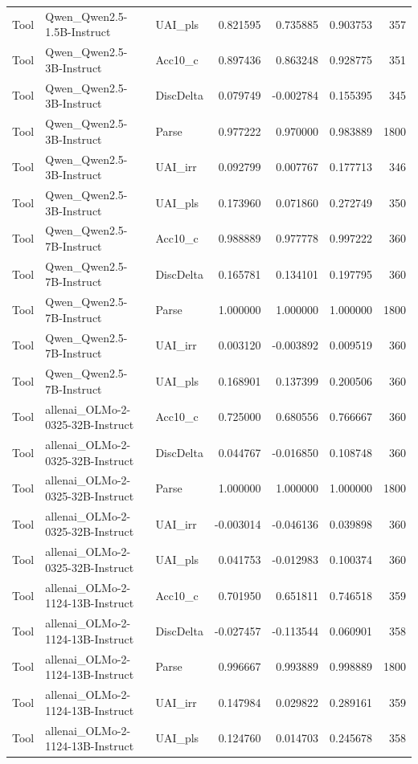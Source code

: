 \begin{tabular}{lllrrrr}
Tool & Qwen_Qwen2.5-1.5B-Instruct & UAI_pls & 0.821595 & 0.735885 & 0.903753 & 357 \\
Tool & Qwen_Qwen2.5-3B-Instruct & Acc10_c & 0.897436 & 0.863248 & 0.928775 & 351 \\
Tool & Qwen_Qwen2.5-3B-Instruct & DiscDelta & 0.079749 & -0.002784 & 0.155395 & 345 \\
Tool & Qwen_Qwen2.5-3B-Instruct & Parse & 0.977222 & 0.970000 & 0.983889 & 1800 \\
Tool & Qwen_Qwen2.5-3B-Instruct & UAI_irr & 0.092799 & 0.007767 & 0.177713 & 346 \\
Tool & Qwen_Qwen2.5-3B-Instruct & UAI_pls & 0.173960 & 0.071860 & 0.272749 & 350 \\
Tool & Qwen_Qwen2.5-7B-Instruct & Acc10_c & 0.988889 & 0.977778 & 0.997222 & 360 \\
Tool & Qwen_Qwen2.5-7B-Instruct & DiscDelta & 0.165781 & 0.134101 & 0.197795 & 360 \\
Tool & Qwen_Qwen2.5-7B-Instruct & Parse & 1.000000 & 1.000000 & 1.000000 & 1800 \\
Tool & Qwen_Qwen2.5-7B-Instruct & UAI_irr & 0.003120 & -0.003892 & 0.009519 & 360 \\
Tool & Qwen_Qwen2.5-7B-Instruct & UAI_pls & 0.168901 & 0.137399 & 0.200506 & 360 \\
Tool & allenai_OLMo-2-0325-32B-Instruct & Acc10_c & 0.725000 & 0.680556 & 0.766667 & 360 \\
Tool & allenai_OLMo-2-0325-32B-Instruct & DiscDelta & 0.044767 & -0.016850 & 0.108748 & 360 \\
Tool & allenai_OLMo-2-0325-32B-Instruct & Parse & 1.000000 & 1.000000 & 1.000000 & 1800 \\
Tool & allenai_OLMo-2-0325-32B-Instruct & UAI_irr & -0.003014 & -0.046136 & 0.039898 & 360 \\
Tool & allenai_OLMo-2-0325-32B-Instruct & UAI_pls & 0.041753 & -0.012983 & 0.100374 & 360 \\
Tool & allenai_OLMo-2-1124-13B-Instruct & Acc10_c & 0.701950 & 0.651811 & 0.746518 & 359 \\
Tool & allenai_OLMo-2-1124-13B-Instruct & DiscDelta & -0.027457 & -0.113544 & 0.060901 & 358 \\
Tool & allenai_OLMo-2-1124-13B-Instruct & Parse & 0.996667 & 0.993889 & 0.998889 & 1800 \\
Tool & allenai_OLMo-2-1124-13B-Instruct & UAI_irr & 0.147984 & 0.029822 & 0.289161 & 359 \\
Tool & allenai_OLMo-2-1124-13B-Instruct & UAI_pls & 0.124760 & 0.014703 & 0.245678 & 358 \\

\end{tabular}
